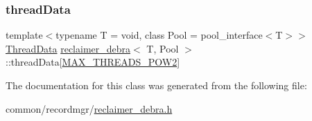 \mbox{\label{classreclaimer__debra_a39e06df091da9fc001bf6a0d90ef070c}} 
\subsubsection{\texorpdfstring{thread\+Data}{threadData}}
{\footnotesize\ttfamily template$<$typename T  = void, class Pool  = pool\+\_\+interface$<$\+T$>$$>$ \\
\hyperlink{classreclaimer__debra_1_1ThreadData}{Thread\+Data} \hyperlink{classreclaimer__debra}{reclaimer\+\_\+debra}$<$ T, Pool $>$\+::thread\+Data\mbox{[}\hyperlink{plaf_8h_ac1585a3455dd3e33e877e588be9e466b}{M\+A\+X\+\_\+\+T\+H\+R\+E\+A\+D\+S\+\_\+\+P\+O\+W2}\mbox{]}\hspace{0.3cm}{\ttfamily [protected]}}



The documentation for this class was generated from the following file\+:\begin{DoxyCompactItemize}
\item 
common/recordmgr/\hyperlink{reclaimer__debra_8h}{reclaimer\+\_\+debra.\+h}\end{DoxyCompactItemize}
